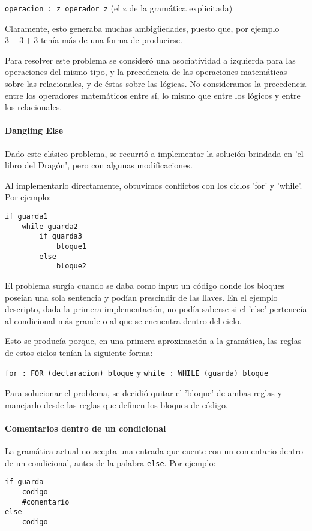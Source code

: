 {\tt operacion : z operador z} (el z de la gramática explicitada)

Claramente, esto generaba muchas ambigüedades, puesto que, por ejemplo $3+3+3$ tenía más de una forma de producirse.

Para resolver este problema se consideró una asociatividad a izquierda para las operaciones del mismo tipo, y la precedencia de las operaciones matemáticas sobre las relacionales, y de éstas sobre las lógicas.  No consideramos la precedencia entre los operadores matemáticos entre sí, lo mismo que entre los lógicos y entre los relacionales.

\paragraph{Dangling Else}
Dado este clásico problema, se recurrió a implementar la solución brindada en 'el libro del Dragón', pero con algunas modificaciones.

Al implementarlo directamente, obtuvimos conflictos con los ciclos 'for' y 'while'.  Por ejemplo:

\begin{lstlisting}
if guarda1
	while guarda2
		if guarda3
			bloque1
		else
			bloque2	
\end{lstlisting}

El problema surgía cuando se daba como input un código donde los bloques poseían una sola sentencia y podían prescindir de las llaves.  En el ejemplo descripto, dada la primera implementación, no podía saberse si el 'else' pertenecía al condicional más grande o al que se encuentra dentro del ciclo.

Esto se producía porque, en una primera aproximación a la gramática, las reglas de estos ciclos tenían la siguiente forma:

{\tt for : FOR (declaracion) bloque} y {\tt while : WHILE (guarda) bloque}

Para solucionar el problema, se decidió quitar el 'bloque' de ambas reglas y manejarlo desde las reglas que definen los bloques de código. 

\paragraph{Comentarios dentro de un condicional}
La gramática actual no acepta una entrada que cuente con un comentario dentro de un condicional, antes de la palabra {\tt else}.  Por ejemplo: 

\begin{lstlisting}
if guarda
	codigo
	#comentario
else
	codigo
\end{lstlisting}